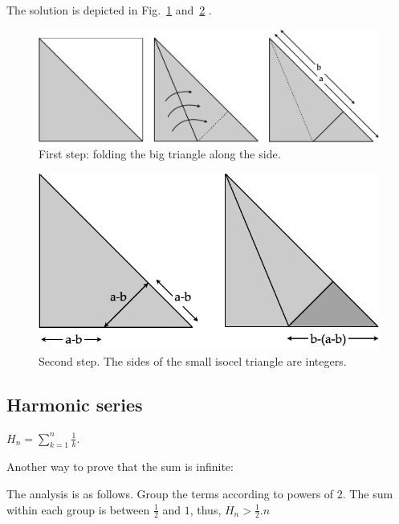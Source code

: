 The solution is depicted in Fig.~\ref{Fig:sqrtbisInit} and~\ref{Fig:sqrtbisFin} . 
\begin{figure}
\begin{center}
        \includegraphics[scale=0.3]{FiguresArithmetic/sqrtbisInit}
        \caption{First step: folding the big triangle along the side.}
        \label{Fig:sqrtbisInit}
\end{center}
\end{figure}
\begin{figure}
\begin{center}
        \includegraphics[scale=0.3]{FiguresArithmetic/sqrtbisFin}
        \caption{Second step. The sides of the small isocel triangle are integers.}
        \label{Fig:sqrtbisFin}
\end{center}
\end{figure}

\subsection{Harmonic series}

$H_{n} = \sum_{k=1}^{n} \frac{1}{k}$.

Another way to prove that the sum is infinite:
 
The analysis is as follows.
Group the terms according to powers of $2$. 
The sum within each group is between $\frac{1}{2}$ and $1$, thus,
$H_n > \frac{1}{2}.n$
\\

